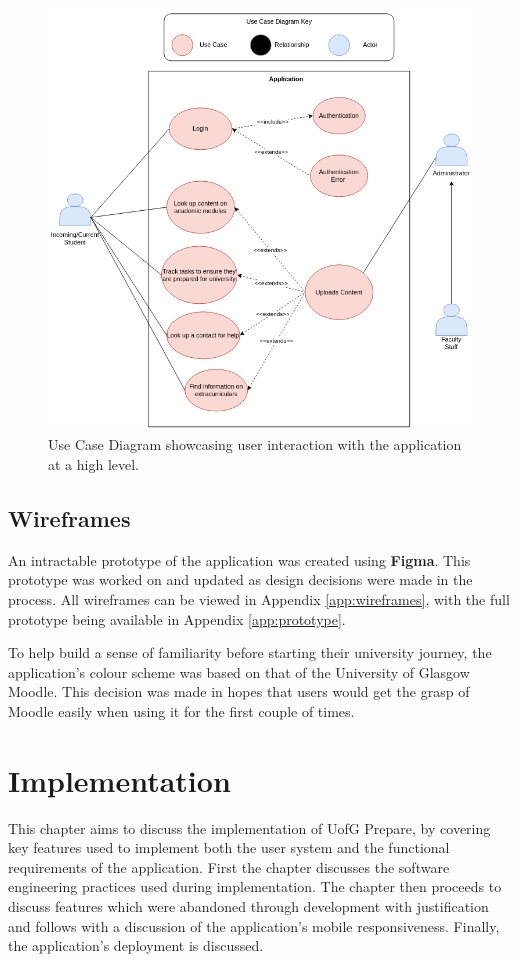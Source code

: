\documentclass{l4proj}
\begin{document}
\begin{figure}[ht]
    \centering
    \includegraphics[width=0.8\linewidth]{images/useCase.pdf}    

    \caption{Use Case Diagram showcasing user interaction with the application at a high level.
    }

    \label{fig:usecase} 
\end{figure}


\section{Wireframes}
An intractable prototype of the application was created using \textbf{Figma}. This prototype was worked on and updated as design decisions were made in the process. All wireframes can be viewed in Appendix \ref{app:wireframes},  with the full prototype being available in Appendix \ref{app:prototype}.

To help build a sense of familiarity before starting their university journey,  the application's colour scheme was based on that of the University of Glasgow Moodle. This decision was made in hopes that users would get the grasp of Moodle easily when using it for the first couple of times.

\chapter{Implementation} \label{implementation}
This chapter aims to discuss the implementation of UofG Prepare, by covering key features used to implement both the user system and the functional requirements of the application. First the chapter discusses the software engineering practices used during implementation. The chapter then proceeds to discuss features which were abandoned through development with justification and follows with a discussion of the application's mobile responsiveness. Finally, the application's deployment is discussed.
\end{document}
